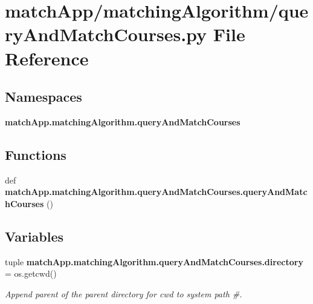 \section{match\+App/matching\+Algorithm/query\+And\+Match\+Courses.py File Reference}
\label{query_and_match_courses_8py}
\subsection*{Namespaces}
\begin{DoxyCompactItemize}
\item 
 {\bf match\+App.\+matching\+Algorithm.\+query\+And\+Match\+Courses}
\end{DoxyCompactItemize}
\subsection*{Functions}
\begin{DoxyCompactItemize}
\item 
def {\bf match\+App.\+matching\+Algorithm.\+query\+And\+Match\+Courses.\+query\+And\+Match\+Courses} ()
\end{DoxyCompactItemize}
\subsection*{Variables}
\begin{DoxyCompactItemize}
\item 
tuple {\bf match\+App.\+matching\+Algorithm.\+query\+And\+Match\+Courses.\+directory} = os.\+getcwd()
\begin{DoxyCompactList}\small\item\em Append parent of the parent directory for cwd to system path \#. \end{DoxyCompactList}\end{DoxyCompactItemize}
